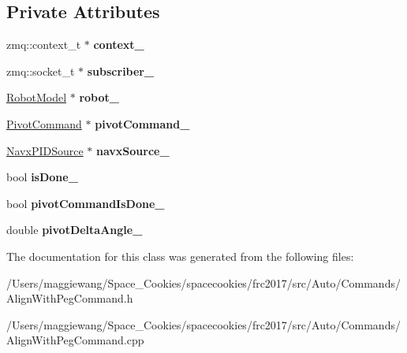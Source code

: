 \subsection*{Private Attributes}
\begin{DoxyCompactItemize}
\item 
\mbox{\label{class_align_with_peg_command_ae4dda5f124199db08d86f12a66f0dc53}} 
zmq\+::context\+\_\+t $\ast$ {\bfseries context\+\_\+}
\item 
\mbox{\label{class_align_with_peg_command_a0e3ef1a7681fc2eca54abeb93e2ab0f1}} 
zmq\+::socket\+\_\+t $\ast$ {\bfseries subscriber\+\_\+}
\item 
\mbox{\label{class_align_with_peg_command_a4c86bc111a4e2e150c86e944b1a87c57}} 
\hyperlink{class_robot_model}{Robot\+Model} $\ast$ {\bfseries robot\+\_\+}
\item 
\mbox{\label{class_align_with_peg_command_a1b6119efd05f41b8b06465562b72a987}} 
\hyperlink{class_pivot_command}{Pivot\+Command} $\ast$ {\bfseries pivot\+Command\+\_\+}
\item 
\mbox{\label{class_align_with_peg_command_a4207f07a4128f397e949b329a6732615}} 
\hyperlink{class_navx_p_i_d_source}{Navx\+P\+I\+D\+Source} $\ast$ {\bfseries navx\+Source\+\_\+}
\item 
\mbox{\label{class_align_with_peg_command_a99596205fd983a9a2818e85696abc6b6}} 
bool {\bfseries is\+Done\+\_\+}
\item 
\mbox{\label{class_align_with_peg_command_a1d6286b2af4b1c7ad98c606af843cc21}} 
bool {\bfseries pivot\+Command\+Is\+Done\+\_\+}
\item 
\mbox{\label{class_align_with_peg_command_a4beed361052a45e507629ed5a4058105}} 
double {\bfseries pivot\+Delta\+Angle\+\_\+}
\end{DoxyCompactItemize}


The documentation for this class was generated from the following files\+:\begin{DoxyCompactItemize}
\item 
/\+Users/maggiewang/\+Space\+\_\+\+Cookies/spacecookies/frc2017/src/\+Auto/\+Commands/Align\+With\+Peg\+Command.\+h\item 
/\+Users/maggiewang/\+Space\+\_\+\+Cookies/spacecookies/frc2017/src/\+Auto/\+Commands/Align\+With\+Peg\+Command.\+cpp\end{DoxyCompactItemize}
